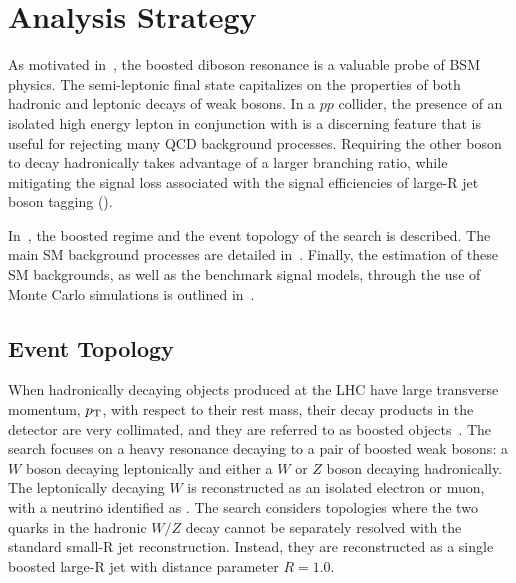 \chapter{Analysis Strategy}
\label{ch:analysisStrategy}
As motivated in~\Ch{\ref{ch:limitations}}, the boosted diboson resonance is a valuable probe of BSM physics. The semi-leptonic final state capitalizes on the properties of both hadronic and leptonic decays of weak bosons. In a $pp$ collider, the presence of an isolated high energy lepton in conjunction with \MET is a discerning feature that is useful for rejecting many QCD background processes. Requiring the other boson to decay hadronically takes advantage of a larger branching ratio, while mitigating the signal loss associated with the signal efficiencies of large-R jet boson tagging (\Sect{\ref{ch:objectReconstruction:larger}}).

In~\Sect{\ref{ch:analysisStrategy:evt_top}}, the boosted regime and the event topology of the search is described. The main SM background processes are detailed in~\Sect{\ref{ch:analysisStrategy:bkgs}}. Finally, the estimation of these SM backgrounds, as well as the benchmark signal models, through the use of Monte Carlo simulations is outlined in~\Sect{\ref{ch:analysisStrategy:sig_bkg_model}}. 

%
\section{Event Topology}
\label{ch:analysisStrategy:evt_top}
When hadronically decaying objects produced at the LHC have large transverse momentum, $p_{\text{T}}$, with respect to their rest mass, their decay products in the detector are very collimated, and they are referred to as boosted objects~\cite{lhc_boosted}. The search focuses on a heavy resonance decaying to a pair of boosted weak bosons: a $W$ boson decaying leptonically and either a $W$ or $Z$ boson decaying hadronically. The leptonically decaying $W$ is reconstructed as an isolated electron or muon, with a neutrino identified as \MET. The search considers topologies where the two quarks in the hadronic $W/Z$ decay cannot be separately resolved with the standard small-R jet reconstruction. Instead, they are reconstructed as a single boosted large-R jet with distance parameter $R=1.0$. 


